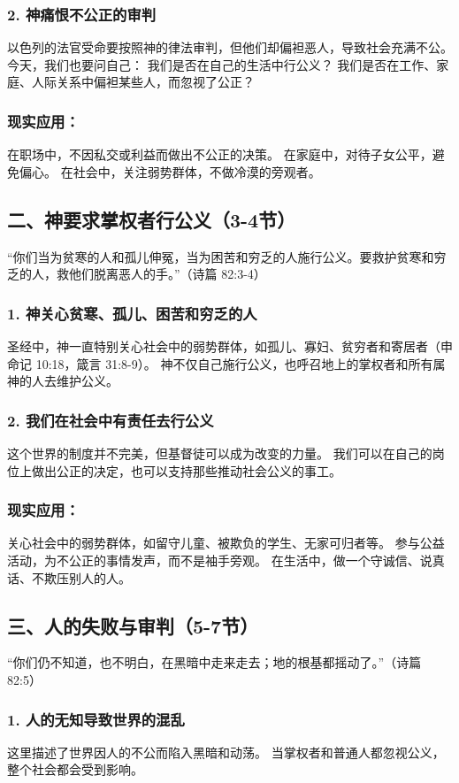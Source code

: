 \documentclass[a4paper, 12pt]{article}
\begin{document}
\subsubsection*{2. 神痛恨不公正的审判}
以色列的法官受命要按照神的律法审判，但他们却偏袒恶人，导致社会充满不公。
今天，我们也要问自己：
我们是否在自己的生活中行公义？
我们是否在工作、家庭、人际关系中偏袒某些人，而忽视了公正？
\subsubsection*{现实应用：}

在职场中，不因私交或利益而做出不公正的决策。
在家庭中，对待子女公平，避免偏心。
在社会中，关注弱势群体，不做冷漠的旁观者。
\subsection*{二、神要求掌权者行公义（3-4节）}
“你们当为贫寒的人和孤儿伸冤，当为困苦和穷乏的人施行公义。要救护贫寒和穷乏的人，救他们脱离恶人的手。”（诗篇 82:3-4）

\subsubsection*{1. 神关心贫寒、孤儿、困苦和穷乏的人}
圣经中，神一直特别关心社会中的弱势群体，如孤儿、寡妇、贫穷者和寄居者（申命记 10:18，箴言 31:8-9）。
神不仅自己施行公义，也呼召地上的掌权者和所有属神的人去维护公义。
\subsubsection*{2. 我们在社会中有责任去行公义}
这个世界的制度并不完美，但基督徒可以成为改变的力量。
我们可以在自己的岗位上做出公正的决定，也可以支持那些推动社会公义的事工。
\subsubsection*{现实应用：}

关心社会中的弱势群体，如留守儿童、被欺负的学生、无家可归者等。
参与公益活动，为不公正的事情发声，而不是袖手旁观。
在生活中，做一个守诚信、说真话、不欺压别人的人。
\subsection*{三、人的失败与审判（5-7节）}
“你们仍不知道，也不明白，在黑暗中走来走去；地的根基都摇动了。”（诗篇 82:5）

\subsubsection*{1. 人的无知导致世界的混乱}
这里描述了世界因人的不公而陷入黑暗和动荡。
当掌权者和普通人都忽视公义，整个社会都会受到影响。
\end{document}
